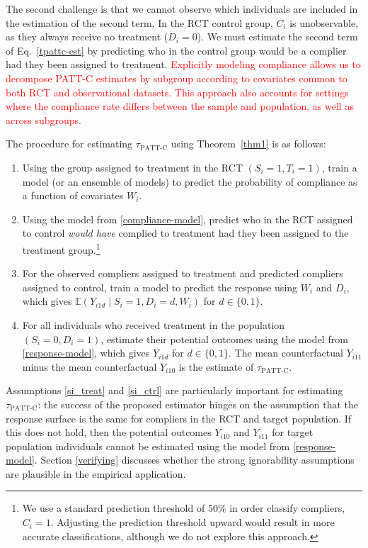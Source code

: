 \documentclass[hidelinks,12pt]{article}
\newcommand{\ex}{\mathbb{E}} %
\begin{document}
The second challenge is that we cannot observe which individuals are included in the estimation of the second term. In the RCT control group, $C_i$ is unobservable, as they always receive no treatment ($D_i=0$). We must estimate the second term of Eq.~\eqref{tpattc-est} by predicting who in the control group would be a complier had they been assigned to treatment. \textcolor{red}{Explicitly modeling compliance allows us to decompose PATT-C estimates by subgroup according to covariates common to both RCT and observational datasets. This approach also accounts for settings where the compliance rate differs between the sample and population, as well as across subgroups.}

The procedure for estimating $\tau_{\text{PATT-C}}$ using Theorem~\eqref{thm1} is as follows:
\begin{enumerate}[label=\textbf{S.\arabic*},ref=S.\arabic*]
\item Using the group assigned to treatment in the RCT $(S_i=1, T_i=1)$, train a model (or an ensemble of models) to predict the probability of compliance as a function of covariates $W_i$. \label{compliance-model}
\item Using the model from \ref{compliance-model}, predict who in the RCT assigned to control \textit{would have} complied to treatment had they been assigned to the treatment group.\footnote{We use a standard prediction threshold of 50\% in order classify compliers, $C_i=1$. Adjusting the prediction threshold upward would result in more accurate classifications, although we do not explore this approach.} \label{complier-predict}
\item For the observed compliers assigned to treatment and predicted compliers assigned to control, train a model to predict the response using $W_i$ and $D_i$, which gives $\ex(Y_{i1d} \mid S_i=1, D_i=d, W_i)$ for $d \in \{0,1\}$.\label{response-model}
\item For all individuals who received treatment in the population $(S_i=0, D_i=1)$, estimate their potential outcomes using the model from \ref{response-model}, which gives $Y_{i1d}$ for $d \in \{0,1\}$. The mean counterfactual $Y_{i11}$ minus the mean counterfactual $Y_{i10}$ is the estimate of $\tau_{\text{PATT-C}}$.\label{response-predict}
\end{enumerate}

Assumptions \eqref{si_treat} and \eqref{si_ctrl} are particularly important for estimating $\tau_{\text{PATT-C}}$: the success of the proposed estimator hinges on the assumption that the response surface is the same for compliers in the RCT and target population. If this does not hold, then the potential outcomes $Y_{i10}$ and $Y_{i11}$ for target population individuals cannot be estimated using the model from \ref{response-model}. Section \ref{verifying} discusses whether the strong ignorability assumptions are plausible in the empirical application.
\end{document}
